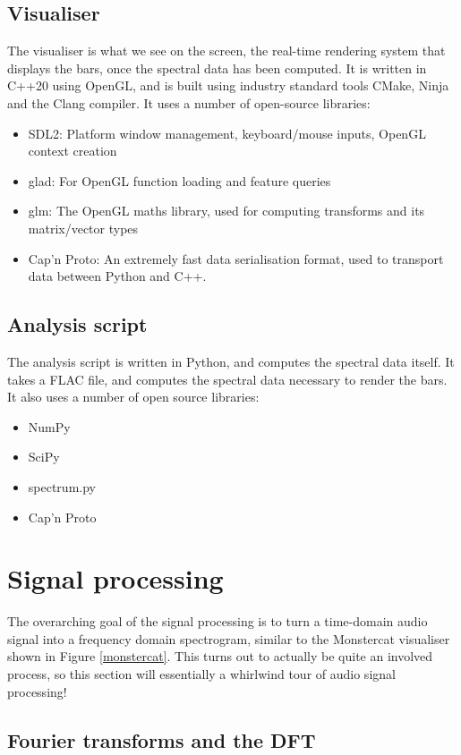 \documentclass[11pt]{article}
\begin{document}
\subsection{Visualiser}
The visualiser is what we see on the screen, the real-time rendering system that displays the bars, once the
spectral data has been computed. It is written in C++20 using OpenGL, and is built using industry standard
tools CMake, Ninja and the Clang compiler. It uses a number of open-source libraries:
\begin{itemize}
	\item SDL2: Platform window management, keyboard/mouse inputs, OpenGL context creation
	\item glad: For OpenGL function loading and feature queries
    \item glm: The OpenGL maths library, used for computing transforms and its matrix/vector types
    \item Cap'n Proto: An extremely fast data serialisation format, used to transport data between Python and
        C++.
\end{itemize}

\subsection{Analysis script}
The analysis script is written in Python, and computes the spectral data itself. It takes a FLAC file, and
computes the spectral data necessary to render the bars. It also uses a number of open source libraries:
\begin{itemize}
    \item NumPy
    \item SciPy
    \item spectrum.py
    \item Cap'n Proto
\end{itemize}

\section{Signal processing}
The overarching goal of the signal processing is to turn a time-domain audio signal into a frequency domain
spectrogram, similar to the Monstercat visualiser shown in Figure \ref{monstercat}. This turns out to actually
be quite an involved process, so this section will essentially a whirlwind tour of audio signal processing!

\subsection{Fourier transforms and the DFT}
\end{document}
